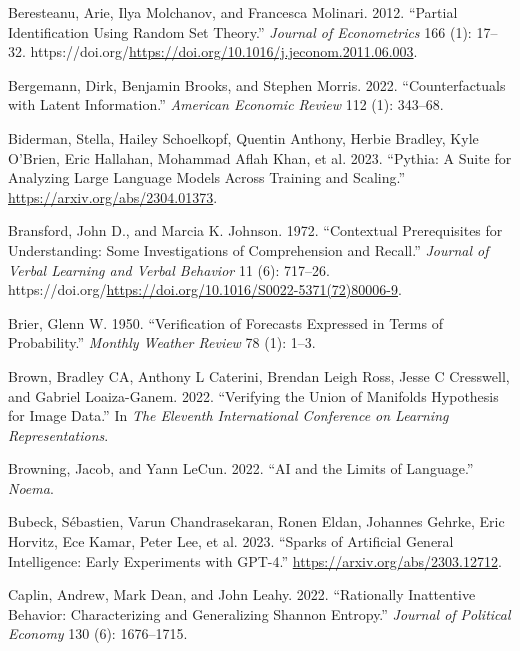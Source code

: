 \documentclass[
]{article}
\newlength{\cslhangindent}
\newenvironment{CSLReferences}[2] %
 {\begin{list}{}{%
  \setlength{\itemindent}{0pt}
  \setlength{\leftmargin}{0pt}
  \setlength{\parsep}{0pt}
  \ifodd #1
   \setlength{\leftmargin}{\cslhangindent}
   \setlength{\itemindent}{-1\cslhangindent}
  \fi
  \setlength{\itemsep}{#2\baselineskip}}}
 {\end{list}}
\begin{document}
\begin{CSLReferences}{1}{0}
Beresteanu, Arie, Ilya Molchanov, and Francesca Molinari. 2012.
{``Partial Identification Using Random Set Theory.''} \emph{Journal of
Econometrics} 166 (1): 17--32.
https://doi.org/\url{https://doi.org/10.1016/j.jeconom.2011.06.003}.

Bergemann, Dirk, Benjamin Brooks, and Stephen Morris. 2022.
{``Counterfactuals with Latent Information.''} \emph{American Economic
Review} 112 (1): 343--68.

Biderman, Stella, Hailey Schoelkopf, Quentin Anthony, Herbie Bradley,
Kyle O'Brien, Eric Hallahan, Mohammad Aflah Khan, et al. 2023.
{``Pythia: A Suite for Analyzing Large Language Models Across Training
and Scaling.''} \url{https://arxiv.org/abs/2304.01373}.

Bransford, John D., and Marcia K. Johnson. 1972. {``Contextual
Prerequisites for Understanding: Some Investigations of Comprehension
and Recall.''} \emph{Journal of Verbal Learning and Verbal Behavior} 11
(6): 717--26.
https://doi.org/\url{https://doi.org/10.1016/S0022-5371(72)80006-9}.

Brier, Glenn W. 1950. {``Verification of Forecasts Expressed in Terms of
Probability.''} \emph{Monthly Weather Review} 78 (1): 1--3.

Brown, Bradley CA, Anthony L Caterini, Brendan Leigh Ross, Jesse C
Cresswell, and Gabriel Loaiza-Ganem. 2022. {``Verifying the Union of
Manifolds Hypothesis for Image Data.''} In \emph{The Eleventh
International Conference on Learning Representations}.

Browning, Jacob, and Yann LeCun. 2022. {``AI and the Limits of
Language.''} \emph{Noema}.

Bubeck, Sébastien, Varun Chandrasekaran, Ronen Eldan, Johannes Gehrke,
Eric Horvitz, Ece Kamar, Peter Lee, et al. 2023. {``Sparks of Artificial
General Intelligence: Early Experiments with GPT-4.''}
\url{https://arxiv.org/abs/2303.12712}.

Caplin, Andrew, Mark Dean, and John Leahy. 2022. {``Rationally
Inattentive Behavior: Characterizing and Generalizing Shannon
Entropy.''} \emph{Journal of Political Economy} 130 (6): 1676--1715.


\end{CSLReferences}
\end{document}
